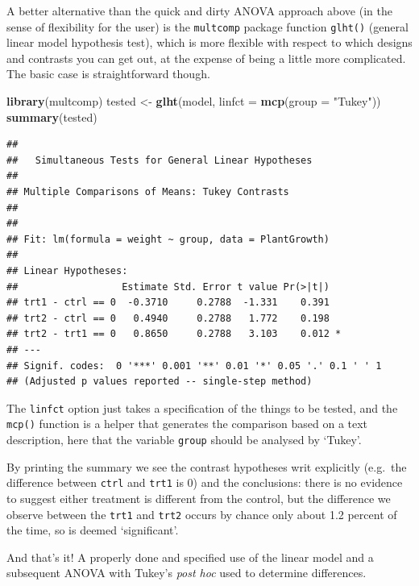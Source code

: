 \documentclass[
]{book}
\newenvironment{Shaded}{\begin{snugshade}}{\end{snugshade}}
\newcommand{\DataTypeTok}[1]{\textcolor[rgb]{0.13,0.29,0.53}{#1}}
\newcommand{\KeywordTok}[1]{\textcolor[rgb]{0.13,0.29,0.53}{\textbf{#1}}}
\newcommand{\NormalTok}[1]{#1}
\newcommand{\StringTok}[1]{\textcolor[rgb]{0.31,0.60,0.02}{#1}}
\begin{document}
A better alternative than the quick and dirty ANOVA approach above (in the sense of flexibility for the user) is the \texttt{multcomp} package function \texttt{glht()} (general linear model hypothesis test), which is more flexible with respect to which designs and contrasts you can get out, at the expense of being a little more complicated. The basic case is straightforward though.

\begin{Shaded}
\begin{Highlighting}[]
\KeywordTok{library}\NormalTok{(multcomp)}
\NormalTok{tested <-}\StringTok{ }\KeywordTok{glht}\NormalTok{(model, }\DataTypeTok{linfct =} \KeywordTok{mcp}\NormalTok{(}\DataTypeTok{group =} \StringTok{"Tukey"}\NormalTok{))}
\KeywordTok{summary}\NormalTok{(tested)}
\end{Highlighting}
\end{Shaded}

\begin{verbatim}
## 
## 	 Simultaneous Tests for General Linear Hypotheses
## 
## Multiple Comparisons of Means: Tukey Contrasts
## 
## 
## Fit: lm(formula = weight ~ group, data = PlantGrowth)
## 
## Linear Hypotheses:
##                  Estimate Std. Error t value Pr(>|t|)  
## trt1 - ctrl == 0  -0.3710     0.2788  -1.331    0.391  
## trt2 - ctrl == 0   0.4940     0.2788   1.772    0.198  
## trt2 - trt1 == 0   0.8650     0.2788   3.103    0.012 *
## ---
## Signif. codes:  0 '***' 0.001 '**' 0.01 '*' 0.05 '.' 0.1 ' ' 1
## (Adjusted p values reported -- single-step method)
\end{verbatim}

The \texttt{linfct} option just takes a specification of the things to be tested, and the \texttt{mcp()} function is a helper that generates the comparison based on a text description, here that the variable \texttt{group} should be analysed by `Tukey'.

By printing the summary we see the contrast hypotheses writ explicitly (e.g.~the difference between \texttt{ctrl} and \texttt{trt1} is 0) and the conclusions: there is no evidence to suggest either treatment is different from the control, but the difference we observe between the \texttt{trt1} and \texttt{trt2} occurs by chance only about 1.2 percent of the time, so is deemed `significant'.

And that's it! A properly done and specified use of the linear model and a subsequent ANOVA with Tukey's \emph{post hoc} used to determine differences.
\end{document}
